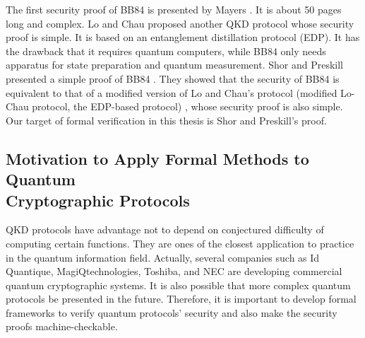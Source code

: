The first security proof of BB84 is presented by Mayers 
\cite{Mayers1998}. It is about 50 pages long and complex.
Lo and Chau proposed another QKD protocol \cite{LoChau1999} whose
security proof is simple. It is based
on an entanglement distillation protocol (EDP).
It has the drawback that it requires quantum
computers, while BB84 only needs apparatus for state preparation and
quantum measurement.
Shor and Preskill presented a simple proof of BB84
\cite{ShorPreskill2000}. They showed that the security of BB84 is
equivalent to that of a modified version of Lo and Chau's protocol
(modified Lo-Chau protocol, the EDP-based protocol) \cite{LoChau1999},
whose security proof is also simple.
Our target of formal verification in this thesis 
is Shor and Preskill's proof.

\subsection{Motivation to Apply Formal Methods to Quantum\\
Cryptographic Protocols}
QKD protocols have advantage not to depend on conjectured difficulty
of computing certain functions.
They are ones of the closest application to practice in the quantum
information field.
Actually, several companies such as Id Quantique,
MagiQtechnologies, Toshiba, and NEC are developing 
commercial quantum cryptographic systems.
It is also possible that more complex quantum protocols
be presented in the future.
Therefore, it is important to develop 
formal frameworks to verify quantum protocols'
security and also make the security proofs machine-checkable.

